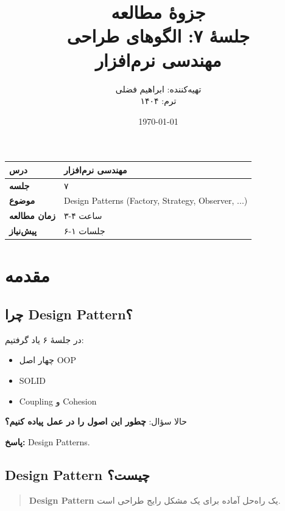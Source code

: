 \documentclass[12pt, a4paper]{article}
\title{
    \vspace{-1cm}
    \textbf{\Huge جزوهٔ مطالعه}\\[0.3cm]
    \textbf{\LARGE جلسهٔ ۷: الگوهای طراحی}\\[0.5cm]
    \large مهندسی نرم‌افزار
}
\author{
    تهیه‌کننده: ابراهیم فضلی\\
    ترم: ۱۴۰۴
}
\date{\today}
\begin{document}
\maketitle
\thispagestyle{empty}

\vspace{1cm}

\begin{center}
\begin{tabular}{|l|l|}
\hline
\textbf{درس} & مهندسی نرم‌افزار \\
\hline
\textbf{جلسه} & ۷ \\
\hline
\textbf{موضوع} & Design Patterns (Factory, Strategy, Observer, ...) \\
\hline
\textbf{زمان مطالعه} & ۳-۴ ساعت \\
\hline
\textbf{پیش‌نیاز} & جلسات ۱-۶ \\
\hline
\end{tabular}
\end{center}

\newpage
\tableofcontents
\newpage

\section{مقدمه}

\subsection{چرا Design Pattern؟}

در جلسهٔ ۶ یاد گرفتیم:
\begin{itemize}
    \item چهار اصل OOP
    \item SOLID
    \item Coupling و Cohesion
\end{itemize}

حالا سؤال: \textbf{چطور این اصول را در عمل پیاده کنیم؟}

\textbf{پاسخ:} Design Patterns.

\subsection{Design Pattern چیست؟}

\begin{quote}
\textbf{Design Pattern} یک راه‌حل آماده برای یک مشکل رایج طراحی است.
\end{quote}
\end{document}
